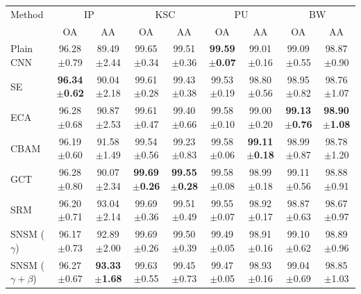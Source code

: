 \begin{tabular}{lcccccccc}
\toprule
Method & \multicolumn{2}{c}{IP} & \multicolumn{2}{c}{KSC} & \multicolumn{2}{c}{PU} & \multicolumn{2}{c}{BW} \\
 & OA & AA & OA & AA & OA & AA & OA & AA \\
\midrule
Plain CNN & 96.28$\pm$0.79 & 89.49$\pm$2.44 & 99.65$\pm$0.34 & 99.51$\pm$0.36 & \textbf{99.59$\pm$0.07} & 99.01$\pm$0.16 & 99.09$\pm$0.55 & 98.87$\pm$0.90 \\
SE & \textbf{96.34$\pm$0.62} & 90.04$\pm$2.18 & 99.61$\pm$0.28 & 99.43$\pm$0.38 & 99.53$\pm$0.19 & 98.80$\pm$0.56 & 98.95$\pm$0.82 & 98.76$\pm$1.07 \\
ECA & 96.28$\pm$0.68 & 90.87$\pm$2.53 & 99.61$\pm$0.47 & 99.40$\pm$0.66 & 99.58$\pm$0.10 & 99.00$\pm$0.20 & \textbf{99.13$\pm$0.76} & \textbf{98.90$\pm$1.08} \\
CBAM & 96.19$\pm$0.60 & 91.58$\pm$1.49 & 99.54$\pm$0.56 & 99.23$\pm$0.83 & 99.58$\pm$0.06 & \textbf{99.11$\pm$0.18} & 98.99$\pm$0.87 & 98.78$\pm$1.20 \\
GCT & 96.28$\pm$0.80 & 90.07$\pm$2.34 & \textbf{99.69$\pm$0.26} & \textbf{99.55$\pm$0.28} & 99.58$\pm$0.08 & 98.99$\pm$0.18 & 99.11$\pm$0.56 & 98.88$\pm$0.91 \\
SRM & 96.20$\pm$0.71 & 93.04$\pm$2.14 & 99.69$\pm$0.36 & 99.51$\pm$0.49 & 99.55$\pm$0.07 & 98.92$\pm$0.17 & 98.87$\pm$0.63 & 98.67$\pm$0.97 \\
SNSM ($\gamma$) & 96.17$\pm$0.73 & 92.89$\pm$2.00 & 99.69$\pm$0.26 & 99.50$\pm$0.39 & 99.49$\pm$0.05 & 98.91$\pm$0.16 & 99.10$\pm$0.62 & 98.89$\pm$0.96 \\
SNSM ($\gamma{+}\beta$) & 96.27$\pm$0.67 & \textbf{93.33$\pm$1.68} & 99.63$\pm$0.55 & 99.45$\pm$0.73 & 99.47$\pm$0.05 & 98.93$\pm$0.16 & 99.04$\pm$0.69 & 98.85$\pm$1.03 \\
\bottomrule
\end{tabular}
